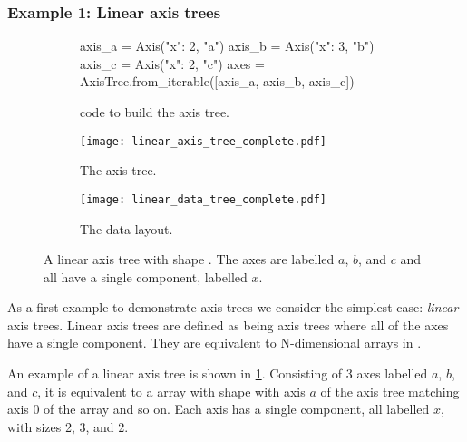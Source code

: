 \documentclass[thesis]{subfiles}
\begin{document}
\subsubsection{Example 1: Linear axis trees}

\begin{figure}
  \centering
  \begin{subfigure}{.9\textwidth}
    \begin{pyalg2}
      axis_a = Axis({"x": 2}, "a")
      axis_b = Axis({"x": 3}, "b")
      axis_c = Axis({"x": 2}, "c")
      axes = AxisTree.from_iterable([axis_a, axis_b, axis_c])
    \end{pyalg2}
    \caption{ code to build the axis tree.}
  \end{subfigure}

  \vspace{1em}

  \begin{subfigure}[t]{.3\textwidth}
    \centering
    \texttt{[image: linear\_axis\_tree\_complete.pdf]}
    \caption{The axis tree.}
  \end{subfigure}
  \begin{subfigure}[t]{.3\textwidth}
    \centering
    \texttt{[image: linear\_data\_tree\_complete.pdf]}
    \caption{The data layout.}
  \end{subfigure}
  \caption{
    A linear axis tree with shape .
    The axes are labelled $a$, $b$, and $c$ and all have a single component, labelled $x$.
  }
  \label{fig:linear_axis_tree}
\end{figure}

As a first example to demonstrate axis trees we consider the simplest case: \emph{linear} axis trees.
Linear axis trees are defined as being axis trees where all of the axes have a single component.
They are equivalent to N-dimensional arrays in \numpy{}.

An example of a linear axis tree is shown in \cref{fig:linear_axis_tree}.
Consisting of 3 axes labelled $a$, $b$, and $c$, it is equivalent to a \numpy{} array with shape  with axis $a$ of the axis tree matching axis 0 of the \numpy{} array and so on.
Each axis has a single component, all labelled $x$, with sizes 2, 3, and 2.
\end{document}
